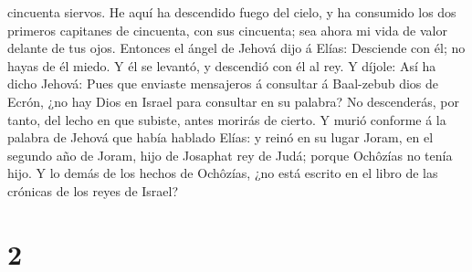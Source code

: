 cincuenta siervos.  He aquí ha descendido fuego del cielo,
y ha consumido los dos primeros capitanes de cincuenta, con sus
cincuenta; sea ahora mi vida de valor delante de tus ojos. 
Entonces el ángel de Jehová dijo á Elías: Desciende con él; no hayas de
él miedo. Y él se levantó, y descendió con él al rey.  Y
díjole: Así ha dicho Jehová: Pues que enviaste mensajeros á consultar á
Baal-zebub dios de Ecrón, ¿no hay Dios en Israel para consultar en su
palabra? No descenderás, por tanto, del lecho en que subiste, antes
morirás de cierto.  Y murió conforme á la palabra de Jehová
que había hablado Elías: y reinó en su lugar Joram, en el segundo año de
Joram, hijo de Josaphat rey de Judá; porque Ochôzías no tenía hijo.
 Y lo demás de los hechos de Ochôzías, ¿no está escrito en
el libro de las crónicas de los reyes de Israel?

\hypertarget{section-1}{%
\section{2}\label{section-1}}


